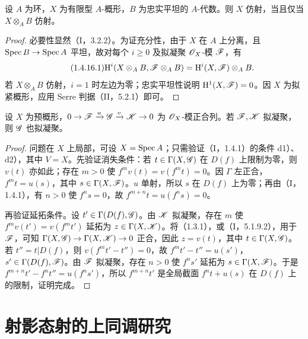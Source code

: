设 $A$ 为环，$X$ 为有限型 $A$-概形，$B$ 为忠实平坦的 $A$-代数。则 $X$ 仿射，当且仅当 $X\otimes_AB$ 仿射。
\begin{proof}
必要性显然（I，3.2.2）。为证充分性，由于 $X$ 在 $A$ 上分离，且 $\operatorname{Spec} B\to\operatorname{Spec} A$ 平坦，故对每个 $i\geq0$ 及拟凝聚 $\mathscr O_X$-模 $\mathscr F$，有
\begin{equation}\tag{1.4.16.1}
\mathrm H^i(X\otimes_AB,\mathscr F\otimes_AB)=\mathrm H^i(X,\mathscr F)\otimes_AB.
\end{equation}
若 $X\otimes_AB$ 仿射，$i=1$ 时左边为零；忠实平坦性说明 $\mathrm H^1(X,\mathscr F)=0$。因 $X$ 为拟紧概形，应用 Serre 判据（II，5.2.1）即可。
\end{proof}

设 $X$ 为预概形，$0\to\mathscr F\xrightarrow{u}\mathscr G\xrightarrow{v}\mathscr K\to0$ 为 $\mathscr O_X$-模正合列。若 $\mathscr F,\mathscr K$ 拟凝聚，则 $\mathscr G$ 也拟凝聚。
\begin{proof}
问题在 $X$ 上局部，可设 $X=\operatorname{Spec} A$；只需验证（I，1.4.1）的条件 d1）、d2），其中 $V=X$。先验证消失条件：若 $t\in\Gamma(X,\mathscr G)$ 在 $D(f)$ 上限制为零，则 $v(t)$ 亦如此；存在 $m>0$ 使 $f^mv(t)=v(f^mt)=0$。因 $\Gamma$ 左正合，$f^mt=u(s)$，其中 $s\in\Gamma(X,\mathscr F)$。$u$ 单射，所以 $s$ 在 $D(f)$ 上为零；再由（I，1.4.1），有 $n>0$ 使 $f^ns=0$，故 $f^{m+n}t=u(f^ns)=0$。

再验证延拓条件。设 $t'\in\Gamma(D(f),\mathscr G)$。由 $\mathscr K$ 拟凝聚，存在 $m$ 使 $f^mv(t')=v(f^mt')$ 延拓为 $z\in\Gamma(X,\mathscr K)$。将（1.3.1），或（I，5.1.9.2），用于 $\mathscr F$，可知 $\Gamma(X,\mathscr G)\to\Gamma(X,\mathscr K)\to0$ 正合，因此 $z=v(t)$，其中 $t\in\Gamma(X,\mathscr G)$。若 $t''=t|D(f)$，则 $v(f^mt'-t'')=0$，故 $f^mt'-t''=u(s')$，$s'\in\Gamma(D(f),\mathscr F)$。由 $\mathscr F$ 拟凝聚，存在 $n>0$ 使 $f^ns'$ 延拓为 $s\in\Gamma(X,\mathscr F)$。于是 $f^{m+n}t'-f^nt''=u(f^ns')$，所以 $f^{m+n}t'$ 是全局截面 $f^nt+u(s)$ 在 $D(f)$ 上的限制，证明完成。
\end{proof}\par

\section{射影态射的上同调研究}
